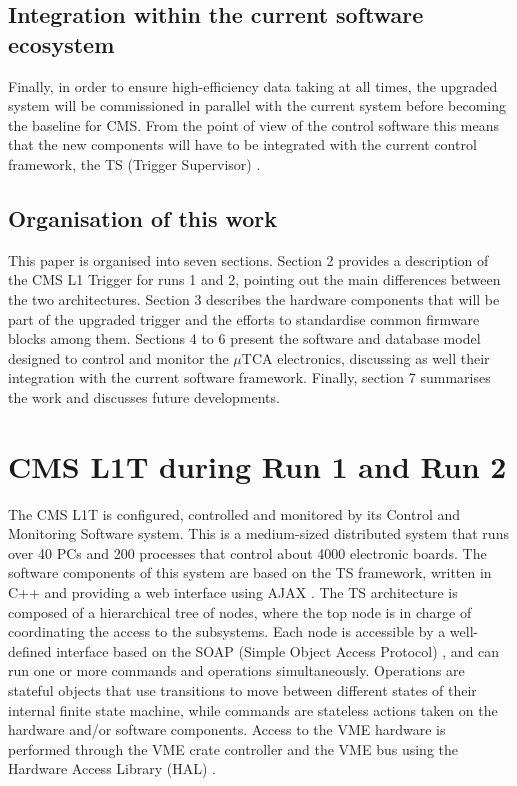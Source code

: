 \documentclass[a4paper]{jpconf}
\begin{document}
\subsection{Integration within the current software ecosystem}
Finally, in order to ensure high-efficiency data taking at all times, the upgraded system will be commissioned in parallel with the current system before becoming the baseline for CMS. From the point of view of the control software this means that the new components will have to be integrated with the current control framework, the TS (Trigger Supervisor) \cite{ts_concept}.

\subsection{Organisation of this work}
This paper is organised into seven sections. Section 2 provides a description of the CMS L1 Trigger for runs 1 and 2, pointing out the main differences between the two architectures. Section 3 describes the hardware components that will be part of the upgraded trigger and the efforts to standardise common firmware blocks among them. Sections 4 to 6 present the software and database model designed to control and monitor the $\mu$TCA electronics, discussing as well their integration with the current software framework. Finally, section 7 summarises the work and discusses future developments.

\section{CMS L1T during Run 1 and Run 2}


The CMS L1T is configured, controlled and monitored by its Control and Monitoring Software system. This is a medium-sized distributed system that runs over 40 PCs and 200 processes that control about 4000 electronic boards. The software components of this system are based on the TS framework, written in C++ and providing a web interface using AJAX \cite{ajaxell_lib}. The TS architecture is composed of a hierarchical tree of nodes, where the top node is in charge of coordinating the access to the subsystems. Each node is accessible by a well-defined interface based on the SOAP (Simple Object Access Protocol) \cite{soap_spec}, and can run one or more commands and operations simultaneously. Operations are stateful objects that use transitions to move between different states of their internal finite state machine, while commands are stateless actions taken on the hardware and/or software components. Access to the VME hardware is performed through the VME crate controller and the VME bus using the Hardware Access Library (HAL) \cite{hal_doc}. 
\end{document}
